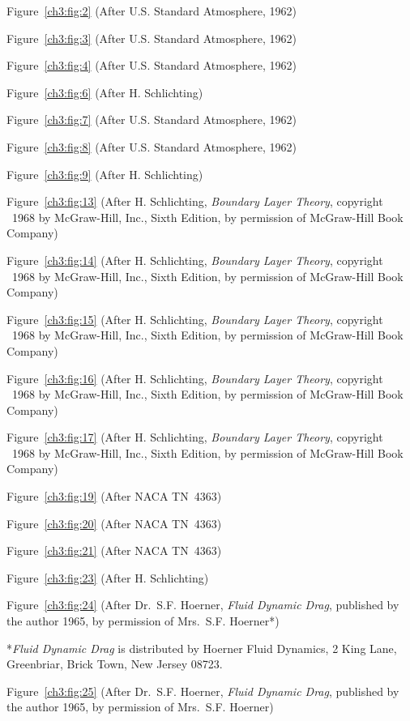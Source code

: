 Figure~\ref{ch3:fig:2} (After U.S. Standard Atmosphere, 1962)

Figure~\ref{ch3:fig:3} (After U.S. Standard Atmosphere, 1962)

Figure~\ref{ch3:fig:4} (After U.S. Standard Atmosphere, 1962)

Figure~\ref{ch3:fig:6} (After H. Schlichting)

Figure~\ref{ch3:fig:7} (After U.S. Standard Atmosphere, 1962)

Figure~\ref{ch3:fig:8} (After U.S. Standard Atmosphere, 1962)

Figure~\ref{ch3:fig:9} (After H. Schlichting)

Figure~\ref{ch3:fig:13} (After H. Schlichting, \emph{Boundary Layer Theory}, copyright
\textcopyright~1968 by McGraw-Hill, Inc., Sixth Edition, by permission of
McGraw-Hill Book Company)

Figure~\ref{ch3:fig:14} (After H. Schlichting, \emph{Boundary Layer Theory}, copyright
\textcopyright~1968 by McGraw-Hill, Inc., Sixth Edition, by permission of
McGraw-Hill Book Company)

Figure~\ref{ch3:fig:15} (After H. Schlichting, \emph{Boundary Layer Theory}, copyright
\textcopyright~1968 by McGraw-Hill, Inc., Sixth Edition, by permission of
McGraw-Hill Book Company)

Figure~\ref{ch3:fig:16} (After H. Schlichting, \emph{Boundary Layer Theory}, copyright
\textcopyright~1968 by McGraw-Hill, Inc., Sixth Edition, by permission of
McGraw-Hill Book Company)

Figure~\ref{ch3:fig:17} (After H. Schlichting, \emph{Boundary Layer Theory}, copyright
\textcopyright~1968 by McGraw-Hill, Inc., Sixth Edition, by permission of
McGraw-Hill Book Company)

Figure~\ref{ch3:fig:19} (After NACA TN~4363)

Figure~\ref{ch3:fig:20} (After NACA TN~4363)

Figure~\ref{ch3:fig:21} (After NACA TN~4363)

Figure~\ref{ch3:fig:23} (After H. Schlichting)

Figure~\ref{ch3:fig:24} (After Dr.~S.F. Hoerner, \emph{Fluid Dynamic Drag}, published
by the author 1965, by permission of Mrs.~S.F. Hoerner*)

*\emph{Fluid Dynamic Drag} is distributed by Hoerner Fluid Dynamics, 2
King Lane, Greenbriar, Brick Town, New Jersey 08723.

Figure~\ref{ch3:fig:25} (After Dr.~S.F. Hoerner, \emph{Fluid Dynamic Drag}, published
by the author 1965, by permission of Mrs.~S.F. Hoerner)

